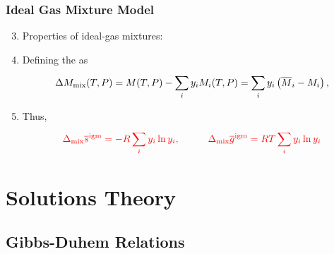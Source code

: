 \documentclass[10pt,compress,unknownkeysallowed]{beamer}
\begin{document}
\begin{frame}
  \frametitle{Ideal Gas Mixture Model}
  \begin{enumerate}\setcounter{enumi}{2}
      \item<1->Properties of ideal-gas mixtures:
      \item<2-> Defining the   as
           \begin{displaymath}
              \Delta M_{\text{mix}}(T,P) =  M(T,P) - \summation[y_{i}M_{i}(T,P)]{i}{} = \summation[y_{i}\left(\overline{M}_{i}-M_{i}\right)]{i}{},
           \end{displaymath}
      \item<3-> Thus,
           \begin{displaymath}
              \red{\Delta_{\text{mix}} \overline{s}^{\text{igm}} = -R\summation[y_{i}\ln{y_{i}}]{i}{}, \hspace{1cm} \Delta_{\text{mix}} \overline{g}^{\text{igm}} = RT\summation[y_{i}\ln{y_{i}}]{i}{}}
           \end{displaymath}


  \end{enumerate}
  \begin{center}
  \end{center}
\end{frame}
\normalsize


\section{Solutions Theory}

\subsection{Gibbs-Duhem Relations}
\end{document}
